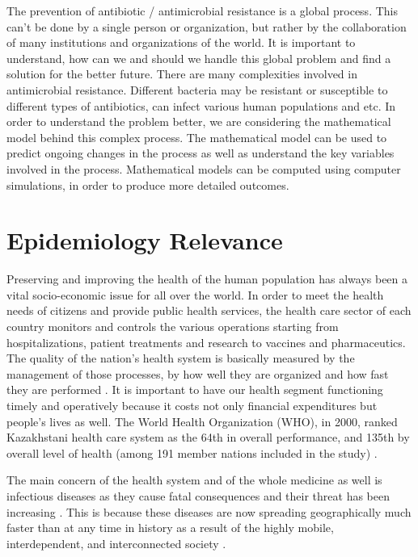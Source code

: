 The prevention of antibiotic / antimicrobial resistance is a global process. This can't be done by a single person or organization, but rather by the collaboration of many institutions and organizations of the world. It is important to understand, how can we and should we handle this global problem and find a solution for the better future. There are many complexities involved in antimicrobial resistance. Different bacteria may be resistant or susceptible to different types of antibiotics, can infect various human populations and etc. In order to understand the problem better, we are considering the mathematical model behind this complex process. The mathematical model can be used to predict ongoing changes in the process as well as understand the key variables involved in the process. Mathematical models can be computed using computer simulations, in order to produce more detailed outcomes.

\section{Epidemiology Relevance}

Preserving and improving the health of the human population has always been a vital socio-economic issue for all over the world. In order to meet the health needs of citizens and provide public health services, the health care sector of each country monitors and controls the various operations starting from hospitalizations, patient treatments and research to vaccines and pharmaceutics. The quality of the nation's health system is basically measured by the management of those processes, by how well they are organized and how fast they are performed \cite{per1}. It is important to have our health segment functioning timely and operatively because it costs not only financial expenditures but people's lives as well. The World Health Organization (WHO), in 2000, ranked Kazakhstani health care system as the 64th in overall performance, and 135th by overall level of health (among 191 member nations included in the study) \cite{per1}.

The main concern of the health system and of the whole medicine as well is infectious diseases as they cause fatal consequences and their threat has been increasing \cite{per1}. This is because these diseases are now spreading geographically much faster than at any time in history as a result of the highly mobile, interdependent, and interconnected society \cite{per2}.

